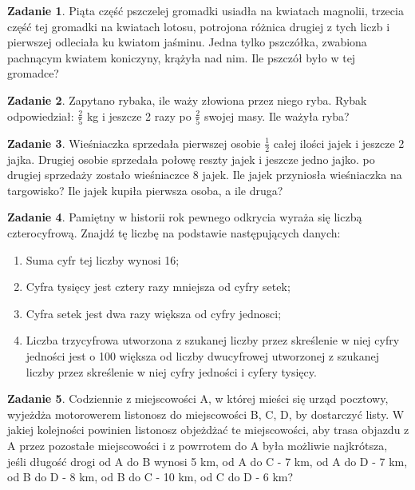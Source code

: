 \documentclass[11pt]{article}
\theoremstyle{definition}
\newtheorem{zad}{Zadanie}
\numberwithin{zad}{section}
\begin{document}
\begin{zad}
Piąta część pszczelej gromadki usiadła na kwiatach magnolii, trzecia część tej gromadki na kwiatach lotosu, potrojona różnica drugiej z tych liczb i pierwszej odleciała ku kwiatom jaśminu. Jedna tylko pszczółka, zwabiona pachnącym kwiatem koniczyny, krążyła nad nim. Ile pszczół było w tej gromadce?
\end{zad}

\begin{zad}
Zapytano rybaka, ile waży złowiona przez niego ryba. Rybak odpowiedział: $\frac25$ kg i jeszcze 2 razy po $\frac25$ swojej masy. Ile ważyła ryba?
\end{zad}

\begin{zad}
Wieśniaczka sprzedała pierwszej osobie $\frac12$ całej ilości jajek i jeszcze 2 jajka. Drugiej osobie sprzedała połowę reszty jajek i jeszcze jedno jajko. po drugiej sprzedaży zostało wieśniaczce 8 jajek. Ile jajek przyniosła wieśniaczka na targowisko? Ile jajek kupiła pierwsza osoba, a ile druga?
\end{zad}

\begin{zad}
Pamiętny w historii rok pewnego odkrycia wyraża się liczbą czterocyfrową. Znajdź tę liczbę na podstawie następujących danych:
\begin{enumerate}
\item Suma cyfr tej liczby wynosi 16;
\item Cyfra tysięcy jest cztery razy mniejsza od cyfry setek;
\item Cyfra setek jest dwa razy większa od cyfry jednosci;
\item Liczba trzycyfrowa utworzona z szukanej liczby przez skreślenie w niej cyfry jedności jest o 100 większa od liczby dwucyfrowej utworzonej z szukanej liczby przez skreślenie w niej cyfry jedności i cyfery tysięcy.
\end{enumerate}
\end{zad}

\begin{zad}
Codziennie z miejscowości A, w której mieści się urząd pocztowy, wyjeżdża motorowerem listonosz do miejscowości B, C, D, by dostarczyć listy. W jakiej kolejności powinien listonosz objeżdżać te miejscowości, aby trasa objazdu z A przez pozostałe miejscowości i z powrrotem do A była możliwie najkrótsza, jeśli długość drogi od A do B wynosi 5 km, od A do C - 7 km, od A do D - 7 km, od B do D - 8 km, od B do C - 10 km, od C do D - 6 km?
\end{zad}
\end{document}
